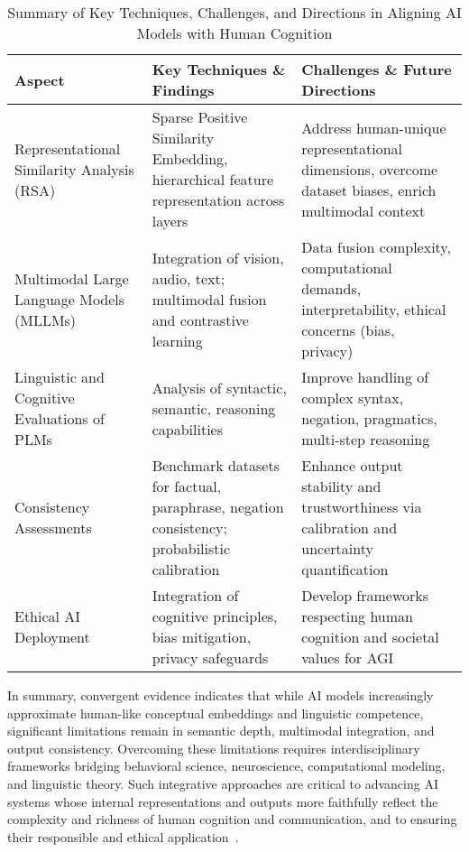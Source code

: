 \documentclass[sigconf]{acmart}
\begin{document}
\begin{table*}[htbp]
\centering
\caption{Summary of Key Techniques, Challenges, and Directions in Aligning AI Models with Human Cognition}
\label{tab:summary_bcns}
\begin{adjustbox}{max width=\textwidth}
\begin{tabular}{@{}lll@{}}
\toprule
\textbf{Aspect} & \textbf{Key Techniques \& Findings} & \textbf{Challenges \& Future Directions} \\ \midrule
Representational Similarity Analysis (RSA) & Sparse Positive Similarity Embedding, hierarchical feature representation across layers~\cite{ref1,ref2} & Address human-unique representational dimensions, overcome dataset biases, enrich multimodal context~\cite{ref2,ref4,ref5} \\
Multimodal Large Language Models (MLLMs) & Integration of vision, audio, text; multimodal fusion and contrastive learning~\cite{ref4,ref5} & Data fusion complexity, computational demands, interpretability, ethical concerns (bias, privacy)~\cite{ref4,ref5} \\
Linguistic and Cognitive Evaluations of PLMs & Analysis of syntactic, semantic, reasoning capabilities~\cite{ref34} & Improve handling of complex syntax, negation, pragmatics, multi-step reasoning~\cite{ref34} \\
Consistency Assessments & Benchmark datasets for factual, paraphrase, negation consistency; probabilistic calibration~\cite{ref35} & Enhance output stability and trustworthiness via calibration and uncertainty quantification~\cite{ref35} \\
Ethical AI Deployment & Integration of cognitive principles, bias mitigation, privacy safeguards~\cite{ref2,ref4,ref5} & Develop frameworks respecting human cognition and societal values for AGI~\cite{ref2,ref4,ref5} \\ \bottomrule
\end{tabular}
\end{adjustbox}
\end{table*}

In summary, convergent evidence indicates that while AI models increasingly approximate human-like conceptual embeddings and linguistic competence, significant limitations remain in semantic depth, multimodal integration, and output consistency. Overcoming these limitations requires interdisciplinary frameworks bridging behavioral science, neuroscience, computational modeling, and linguistic theory. Such integrative approaches are critical to advancing AI systems whose internal representations and outputs more faithfully reflect the complexity and richness of human cognition and communication, and to ensuring their responsible and ethical application~\cite{ref2,ref4,ref5,ref34,ref35}.
\end{document}
